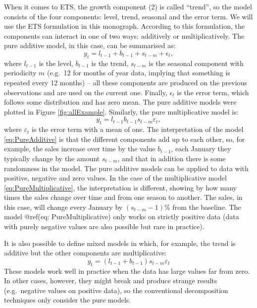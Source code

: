 \documentclass[
]{book}
\theoremstyle{definition}
\theoremstyle{definition}
\theoremstyle{definition}
\theoremstyle{definition}
\theoremstyle{remark}
\begin{document}
When it comes to ETS, the growth component (2) is called ``trend'', so the model consists of the four components: level, trend, seasonal and the error term. We will use the ETS formulation in this monograph. According to this formulation, the components can interact in one of two ways: additively or multiplicatively. The pure additive model, in this case, can be summarised as:
\begin{equation}
    y_t = l_{t-1} + b_{t-1} + s_{t-m} + \epsilon_t ,
    \label{eq:PureAdditive}
\end{equation}
where \(l_{t-1}\) is the level, \(b_{t-1}\) is the trend, \(s_{t-m}\) is the seasonal component with periodicity \(m\) (e.g.~12 for months of year data, implying that something is repeated every 12 months) -- all these components are produced on the previous observations and are used on the current one. Finally, \(\epsilon_t\) is the error term, which follows some distribution and has zero mean. The pure additive models were plotted in Figure \ref{fig:allExample}. Similarly, the pure multiplicative model is:
\begin{equation}
    y_t = l_{t-1} b_{t-1} s_{t-m} \varepsilon_t ,
    \label{eq:PureMultiplicative}
\end{equation}
where \(\varepsilon_t\) is the error term with a mean of one. The interpretation of the model \eqref{eq:PureAdditive} is that the different components add up to each other, so, for example, the sales increase over time by the value \(b_{t-1}\), each January they typically change by the amount \(s_{t-m}\), and that in addition there is some randomness in the model. The pure additive models can be applied to data with positive, negative and zero values. In the case of the multiplicative model \eqref{eq:PureMultiplicative}, the interpretation is different, showing by how many times the sales change over time and from one season to another. The sales, in this case, will change every January by \((s_{t-m}-1)\)\% from the baseline. The model @ref(eq: PureMultiplicative) only works on strictly positive data (data with purely negative values are also possible but rare in practice).

It is also possible to define mixed models in which, for example, the trend is additive but the other components are multiplicative:
\begin{equation}
    y_t = (l_{t-1} + b_{t-1}) s_{t-m} \varepsilon_t
    \label{eq:MixedAdditiveTrend}
\end{equation}
These models work well in practice when the data has large values far from zero. In other cases, however, they might break and produce strange results (e.g.~negative values on positive data), so the conventional decomposition techniques only consider the pure models.
\end{document}
